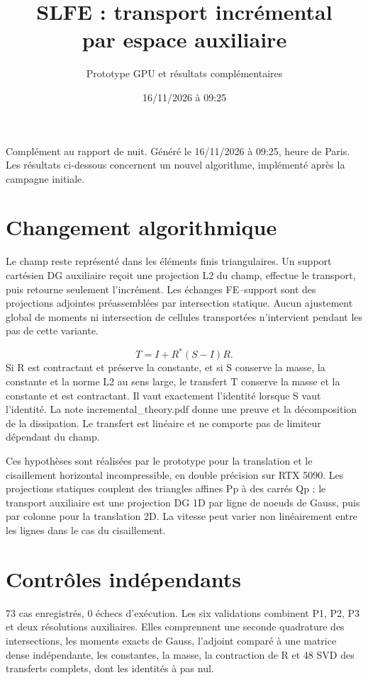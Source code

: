 \documentclass[10pt,a4paper]{article}
\title{SLFE : transport incrémental\\par espace auxiliaire}
\author{Prototype GPU et résultats complémentaires}\date{16/11/2026 à 09:25}
\begin{document}
\maketitle
Complément au rapport de nuit. Généré le 16/11/2026 à 09:25, heure de Paris. Les résultats ci-dessous concernent un nouvel algorithme, implémenté après la campagne initiale.

\section{Changement algorithmique}
Le champ reste représenté dans les éléments finis triangulaires. Un support cartésien DG auxiliaire reçoit une projection L2 du champ, effectue le transport, puis retourne seulement l'incrément. Les échanges FE–support sont des projections adjointes préassemblées par intersection statique. Aucun ajustement global de moments ni intersection de cellules transportées n'intervient pendant les pas de cette variante.

\[\boxed{T=I+R^*(S-I)R.}\]
Si R est contractant et préserve la constante, et si S conserve la masse, la constante et la norme L2 au sens large, le transfert T conserve la masse et la constante et est contractant. Il vaut exactement l'identité lorsque S vaut l'identité. La note incremental\_theory.pdf donne une preuve et la décomposition de la dissipation. Le transfert est linéaire et ne comporte pas de limiteur dépendant du champ.

Ces hypothèses sont réalisées par le prototype pour la translation et le cisaillement horizontal incompressible, en double précision sur RTX 5090. Les projections statiques couplent des triangles affines Pp à des carrés Qp ; le transport auxiliaire est une projection DG 1D par ligne de noeuds de Gauss, puis par colonne pour la translation 2D. La vitesse peut varier non linéairement entre les lignes dans le cas du cisaillement.

\section{Contrôles indépendants}
73 cas enregistrés, 0 échecs d'exécution. Les six validations combinent P1, P2, P3 et deux résolutions auxiliaires. Elles comprennent une seconde quadrature des intersections, les moments exacts de Gauss, l'adjoint comparé à une matrice dense indépendante, les constantes, la masse, la contraction de R et 48 SVD des transferts complets, dont les identités à pas nul.
\end{document}
